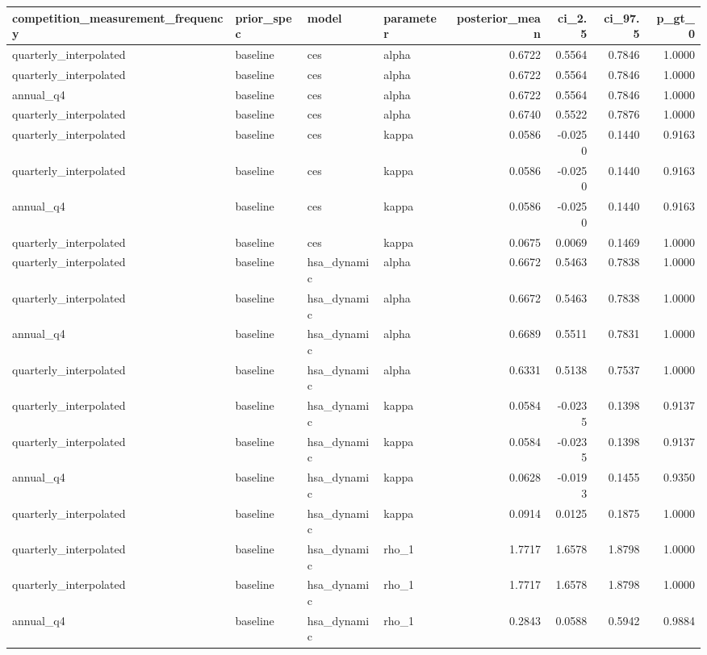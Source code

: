 \begin{tabular}{llllrrrr}
\toprule
competition\_measurement\_frequency & prior\_spec & model & parameter & posterior\_mean & ci\_2.5 & ci\_97.5 & p\_gt\_0 \\
\midrule
quarterly\_interpolated & baseline & ces & alpha & 0.6722 & 0.5564 & 0.7846 & 1.0000 \\
quarterly\_interpolated & baseline & ces & alpha & 0.6722 & 0.5564 & 0.7846 & 1.0000 \\
annual\_q4 & baseline & ces & alpha & 0.6722 & 0.5564 & 0.7846 & 1.0000 \\
quarterly\_interpolated & baseline & ces & alpha & 0.6740 & 0.5522 & 0.7876 & 1.0000 \\
quarterly\_interpolated & baseline & ces & kappa & 0.0586 & -0.0250 & 0.1440 & 0.9163 \\
quarterly\_interpolated & baseline & ces & kappa & 0.0586 & -0.0250 & 0.1440 & 0.9163 \\
annual\_q4 & baseline & ces & kappa & 0.0586 & -0.0250 & 0.1440 & 0.9163 \\
quarterly\_interpolated & baseline & ces & kappa & 0.0675 & 0.0069 & 0.1469 & 1.0000 \\
quarterly\_interpolated & baseline & hsa\_dynamic & alpha & 0.6672 & 0.5463 & 0.7838 & 1.0000 \\
quarterly\_interpolated & baseline & hsa\_dynamic & alpha & 0.6672 & 0.5463 & 0.7838 & 1.0000 \\
annual\_q4 & baseline & hsa\_dynamic & alpha & 0.6689 & 0.5511 & 0.7831 & 1.0000 \\
quarterly\_interpolated & baseline & hsa\_dynamic & alpha & 0.6331 & 0.5138 & 0.7537 & 1.0000 \\
quarterly\_interpolated & baseline & hsa\_dynamic & kappa & 0.0584 & -0.0235 & 0.1398 & 0.9137 \\
quarterly\_interpolated & baseline & hsa\_dynamic & kappa & 0.0584 & -0.0235 & 0.1398 & 0.9137 \\
annual\_q4 & baseline & hsa\_dynamic & kappa & 0.0628 & -0.0193 & 0.1455 & 0.9350 \\
quarterly\_interpolated & baseline & hsa\_dynamic & kappa & 0.0914 & 0.0125 & 0.1875 & 1.0000 \\
quarterly\_interpolated & baseline & hsa\_dynamic & rho\_1 & 1.7717 & 1.6578 & 1.8798 & 1.0000 \\
quarterly\_interpolated & baseline & hsa\_dynamic & rho\_1 & 1.7717 & 1.6578 & 1.8798 & 1.0000 \\
annual\_q4 & baseline & hsa\_dynamic & rho\_1 & 0.2843 & 0.0588 & 0.5942 & 0.9884 \\

\end{tabular}
